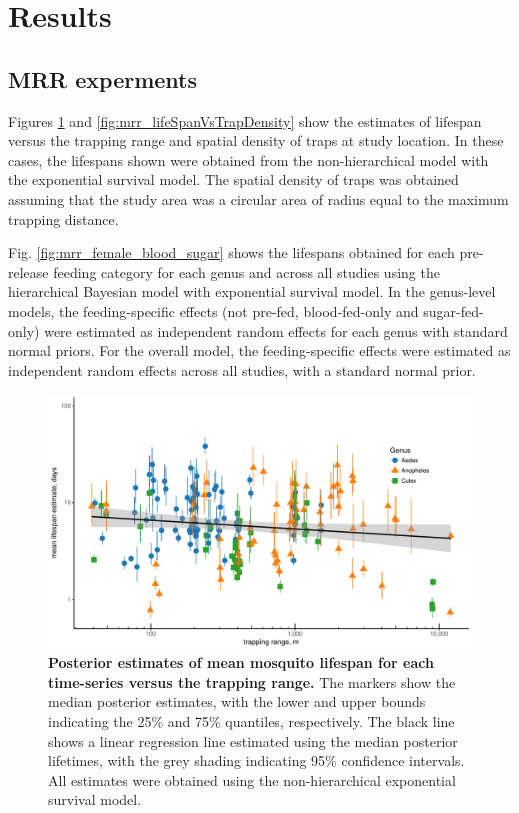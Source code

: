 \documentclass[12pt]{article}
\begin{document}
{\section{Results}
\subsection{MRR experments}
Figures \ref{fig:mrr_lifeSpanVsRange} and \ref{fig:mrr_lifeSpanVsTrapDensity} show the estimates of lifespan versus the trapping range and spatial density of traps at study location. In these cases, the lifespans shown were obtained from the non-hierarchical model with the exponential survival model. The spatial density of traps was obtained assuming that the study area was a circular area of radius equal to the maximum trapping distance.

Fig. \ref{fig:mrr_female_blood_sugar} shows the lifespans obtained for each pre-release feeding category for each genus and across all studies using the hierarchical Bayesian model with exponential survival model. In the genus-level models, the feeding-specific effects (not pre-fed, blood-fed-only and sugar-fed-only) were estimated as independent random effects for each genus with standard normal priors. For the overall model, the feeding-specific effects were estimated as independent random effects across all studies, with a standard normal prior.

\begin{figure}[h]
	\centerline{\includegraphics[width=1\textwidth]{./Figure_files/mrr_lifeSpanVsRange.pdf}}
	\caption{\textbf{Posterior estimates of mean mosquito lifespan for each time-series versus the trapping range.} The markers show the median posterior estimates, with the lower and upper bounds indicating the 25\% and 75\% quantiles, respectively. The black line shows a linear regression line estimated using the median posterior lifetimes, with the grey shading indicating 95\% confidence intervals. All estimates were obtained using the non-hierarchical exponential survival model.}
	\label{fig:mrr_lifeSpanVsRange}
\end{figure}

}
\end{document}
